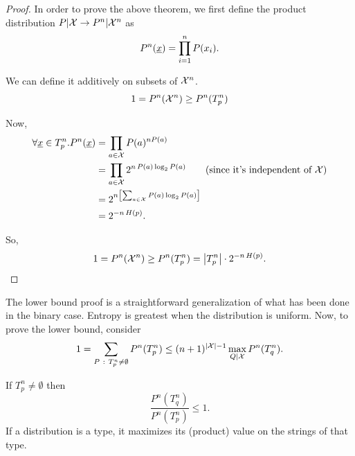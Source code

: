 \begin{proof}
	In order to prove the above theorem, we first define the product distribution $P|\mathcal{X} \to P^n|\mathcal{X}^n$ as 
	\begin{equation*}
		P^n(\underline{x}) = \prod_{i = 1}^nP(x_i).
	\end{equation*}

	We can define it additively on subsets of $\mathcal{X}^n$.
	\begin{equation*}
		1 = P^n(\mathcal{X}^n) \ge P^n(T_p^n)
	\end{equation*}

	Now,
	\begin{align*}
		\forall \str{x} \in T_p^n . P^n(\str{x})
		& =
		\prod_{a \in \X} P(a)^{n P(a)}
		\\
		& =
		\prod_{a \in \X} 2^{n \, P(a)\log_2 P(a)} \tag{since it's independent of $\X$}
		\\
		& =
		2^{n \left[\sum_{a \in \X} P(a) \log_2 P(a) \right]}
		\\
		& =
		2^{-n \, \Entropy{p}}.
	\end{align*}

	So,
	\begin{equation*}
		1 = P^n(\mathcal{X}^n) \ge P^n(T^n_p) = \left|{T_p^n}\right| \cdot 2^{-n \, H\left({p}\right)}.
	\end{equation*}
\end{proof}

The lower bound proof is a straightforward generalization of what has been done in the binary case.
Entropy is greatest when the distribution is uniform.
Now, to prove the lower bound, consider
\begin{equation*}
	1
	=
	\sum_{P\ :\ T_p^n \neq \emptyset} P^n(T_p^n)
	\le
	(n+1)^{\left|{\mathcal{X}}\right|-1} \max_{Q|\mathcal{X}} P^n(T_q^n).
\end{equation*}

\begin{obs}
	If $T^n_p \neq \emptyset$ then 
	\begin{equation*}
		\frac{P^n(T^n_q)}{P^n(T^n_p)} \le 1.
	\end{equation*}
	If a distribution is a type, it maximizes its (product) value on the strings of that type. 
\end{obs}

